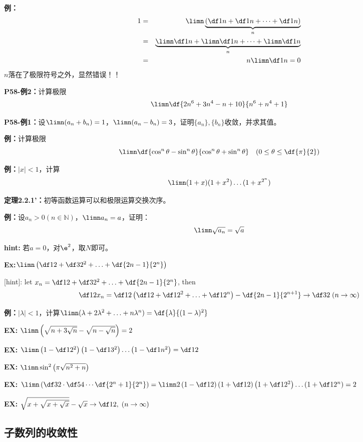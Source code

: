{\bf 例：}
\begin{eqnarray*}
	1&=&\limn \underbrace{\left(\df 1n+\df 1n+\cdots+\df 1n\right)}_{n}\\
	&=&\underbrace{\limn\df1n+\limn\df1n+\cdots+\limn\df1n}_{n}\\
	&=&n\limn\df1n=0
\end{eqnarray*}
$n$落在了极限符号之外，显然错误！！

{\bf P58-例2：}计算极限
$$\limn\df{2n^6+3n^4-n+10}{n^6+n^4+1}$$

{\bf P58-例1：}设$\limn(a_n+b_n)=1$，$\limn(a_n-b_n)=3$，证明$\{a_n\},\{b_n\}$收敛，并求其值。

{\bf 例：}计算极限
$$\limn\df{\cos^n\theta-\sin^n\theta}{\cos^n\theta+\sin^n\theta}\quad
(0\leq\theta\leq\df{\pi}{2})$$

{\bf 例：}$|x|<1$，计算
$$\limn(1+x)(1+x^2)\ldots(1+x^{2^n})$$

{\bf 定理2.2.1'：}初等函数运算可以和极限运算交换次序。

{\bf 例：}设$a_n>0(n\in\mathbb{N})$，$\limn a_n=a$，证明：
$$\limn\sqrt{a_n}=\sqrt a$$

{\bf hint:} 若$a=0$，对$\e^2$，取$N$即可。

{\bf Ex:}$\limn\left(\df12+\df3{2^2}+\ldots+\df{2n-1}{2^n}\right)$

[hint]: let $x_n=\df12+\df3{2^2}+\ldots+\df{2n-1}{2^n}$, then
$$\df12x_n=\df12\left(\df12+\df1{2^2}+\ldots+\df1{2^n}\right)
-\df{2n-1}{2^{n+1}}\to\df32\;(n\to\infty)$$

{\bf 例：}$|\lambda|<1$，计算$\limn(\lambda+2\lambda^2+\ldots+n\lambda^n)
=\df{\lambda}{(1-\lambda)^2}$ 

{\bf EX:} $\limn\left(\sqrt{n+3\sqrt n}-\sqrt{n-\sqrt{n}}\right)=2$

{\bf EX:} $\limn\left(1-\df1{2^2}\right)\left(1-\df1{3^2}\right)\ldots
\left(1-\df1{n^2}\right)=\df12$

{\bf EX:} $\limn\sin^2\left(\pi\sqrt{n^2+n}\right)$

{\bf EX:} $\limn\left(\df32\cdot\df54\cdots\df{2^n+1}{2^n}\right)
=\limn2\left(1-\df12\right)\left(1+\df12\right)\left(1+\df1{2^2}\right)
\ldots\left(1+\df1{2^n}\right)=2$

{\bf EX:} $\sqrt{x+\sqrt{x+\sqrt x}}-\sqrt x\to\df12,\;(n\to\infty)$

\subsection{子数列的收敛性}

